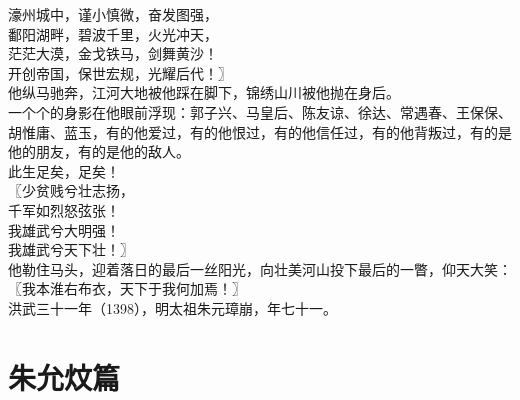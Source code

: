 \begin{multicols}{\theparacolNo}
濠州城中，谨小慎微，奋发图强，\\

鄱阳湖畔，碧波千里，火光冲天，\\

茫茫大漠，金戈铁马，剑舞黄沙！\\

开创帝国，保世宏规，光耀后代！〗\\

他纵马驰奔，江河大地被他踩在脚下，锦绣山川被他抛在身后。\\

一个个的身影在他眼前浮现：郭子兴、马皇后、陈友谅、徐达、常遇春、王保保、胡惟庸、蓝玉，有的他爱过，有的他恨过，有的他信任过，有的他背叛过，有的是他的朋友，有的是他的敌人。\\

此生足矣，足矣！\\

〖少贫贱兮壮志扬，\\

千军如烈怒弦张！\\

我雄武兮大明强！\\

我雄武兮天下壮！〗\\

他勒住马头，迎着落日的最后一丝阳光，向壮美河山投下最后的一瞥，仰天大笑：\\

〖我本淮右布衣，天下于我何加焉！〗\\

洪武三十一年（1398），明太祖朱元璋崩，年七十一。\\
\ifnum{}
	\end{multicols}
\fi
\newpage
\setcounter{chapter}{1}
\setcounter{section}{23}
\chapter*{朱允炆篇}
